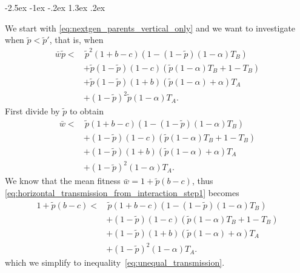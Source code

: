 \documentclass[12pt]{extarticle}
\makeatletter
\renewcommand\section{\@startsection {section}{1}{\z@}%
     {-2.5ex \@plus -1ex \@minus -.2ex}%
     {1.3ex \@plus.2ex}%
    {\Large\bfseries}}
\makeatother
\begin{document}
\begin{appendices}
\renewcommand{\theequation}{\thesection\arabic{equation}}

\section{} \label{sec:appendixA}

We start with \autoref{eq:nextgen_parents_vertical_only} and we want to investigate when $\tilde{p}< \tilde{p}'$, that is, when 
\begin{equation} \label{eq:horizontal_transmission_from_interaction_step0}
\begin{aligned}
\bar{w}\tilde{p} < & \, \tilde{p}^2 (1+b-c) (1 - (1-\tilde{p}) (1-\alpha) T_B) \\
& + \tilde{p}(1-\tilde{p}) (1-c) (\tilde{p} (1-\alpha) T_B + 1 - T_B) \\
& + \tilde{p}(1-\tilde{p}) (1+b) (\tilde{p} (1-\alpha) + \alpha) T_A \\
& + (1-\tilde{p})^2 \tilde{p} (1-\alpha) T_A .
\end{aligned}
\end{equation}
First divide by $\tilde{p}$ to obtain
\begin{equation} \label{eq:horizontal_transmission_from_interaction_step1} 
\begin{aligned} 
  \bar{w} < & \, \tilde{p}(1+b-c) (1 - (1-\tilde{p}) (1-\alpha) T_B) \\
  & + (1-\tilde{p}) (1-c) (\tilde{p} (1-\alpha) T_B + 1 - T_B) \\
  & + (1-\tilde{p}) (1+b) (\tilde{p} (1-\alpha) + \alpha) T_A \\
  & + (1-\tilde{p})^2 (1-\alpha) T_A .
\end{aligned}
\end{equation}
We know that the mean fitness $\bar{w} = 1 + \tilde{p}(b-c)$, thus \autoref{eq:horizontal_transmission_from_interaction_step1} becomes
\begin{equation} \label{eq:horizontal_transmission_from_interaction_step2} 
\begin{aligned} 
  1 + \tilde{p}(b-c) < & \, \tilde{p}(1+b-c) (1 - (1-\tilde{p}) (1-\alpha) T_B) \\
  & + (1-\tilde{p}) (1-c) (\tilde{p} (1-\alpha) T_B + 1 - T_B) \\
  & + (1-\tilde{p}) (1+b) (\tilde{p} (1-\alpha) + \alpha) T_A \\
  & + (1-\tilde{p})^2 (1-\alpha) T_A .
\end{aligned}
\end{equation}
which we simplify to inequality~\autoref{eq:unequal_transmission}.


\end{appendices}
\end{document}
